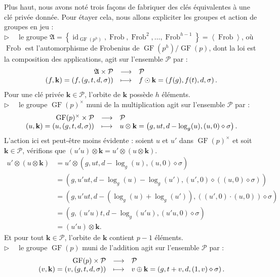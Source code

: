 \documentclass[a4paper, titlepage]{article}
\theoremstyle{definition}
\theoremstyle{remark}
\def\gf{\operatorname{GF}}
\def\frob{\operatorname{Frob}}
\def\id{\operatorname{id}}
\def\gen #1{\left\langle#1\right\rangle}
\begin{document}
Plus haut, nous avons noté trois façons de fabriquer des clés équivalentes à une clé privée donnée. Pour étayer cela, nous allons expliciter les groupes et action de groupes en jeu : \\
$\triangleright \quad$ le groupe $\mathfrak{A} = \left\{ \id_{\gf(p^h)}, \frob, \frob^2, \dots, \frob^{h-1} \right\} = \gen{\frob}$, où $\frob$ est l'automorphisme de Frobenius de $\gf(p^h)/\gf(p)$, dont la loi est la composition des applications, agit sur l'ensemble $\mathcal{P}$ par :
$$\begin{array}{r c l}
\mathfrak{A} \times \mathcal{P}& \longrightarrow& \mathcal{P} \\
(f, \mathbf{k}) = \left(f, \left(g,t,d,\sigma \right)\right)& \longmapsto& f\odot\mathbf{k} = \left(f(g), f(t), d, \sigma \right).
\end{array}$$ 
Pour une clé privée $\mathbf{k} \in \mathcal{P}$, l'orbite de $\mathbf{k}$ possède $h$ éléments.\\
$\triangleright \quad$ le groupe $\gf(p)^\times$ muni de la multiplication agit sur l'ensemble $\mathcal{P}$ par :
$$\begin{array}{r c l}
\gf(p)^\times \times \mathcal{P}& \longrightarrow& \mathcal{P} \\
(u, \mathbf{k}) = \left(u, \left(g,t,d,\sigma \right)\right)& \longmapsto& u\otimes\mathbf{k} = \left(g,ut,d - \log_g(u),(u,0)\diamond\sigma \right).
\end{array}$$
L'action ici est peut-être moins évidente : soient $u$ et $u'$ dans $\gf(p)^\times$ et soit $\mathbf{k} \in \mathcal{P}$, vérifions que $(u'u)\otimes\mathbf{k} = u'\otimes(u\otimes\mathbf{k})$.
\begin{align*}
u'\otimes(u\otimes\mathbf{k}) &= u'\otimes(g,ut,d - \log_g(u),(u,0)\diamond\sigma) \\
&= (g,u'ut,d - \log_g(u) - \log_g(u'),(u',0)\diamond((u,0)\diamond\sigma)) \\
&= (g,u'ut,d - (\log_g(u) + \log_g(u')),((u',0)\cdot(u,0))\diamond\sigma) \\
&= (g,(u'u)t,d - \log_g(u'u),(u'u,0)\diamond\sigma) \\
&= (u'u)\otimes\mathbf{k}.
\end{align*} 
Et pour tout $\mathbf{k} \in \mathcal{P}$, l'orbite de $\mathbf{k}$ contient $p-1$ éléments.\\
$\triangleright \quad$ le groupe $\gf(p)$ muni de l'addition agit sur l'ensemble $\mathcal{P}$ par :
$$\begin{array}{r c l}
\gf(p) \times \mathcal{P}& \longrightarrow& \mathcal{P} \\
(v, \mathbf{k}) = \left(v, \left(g,t,d,\sigma \right)\right)& \longmapsto& v\oplus\mathbf{k} = \left(g,t+v,d,(1,v)\diamond\sigma \right).
\end{array}$$
\end{document}

